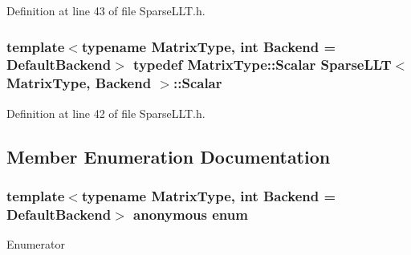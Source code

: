 Definition at line 43 of file Sparse\-L\-L\-T.\-h.

\hypertarget{class_sparse_l_l_t_acc629078ed9cd42c5d1d2c16012de3a4}{
\subsubsection[{Scalar}]{\setlength{\rightskip}{0pt plus 5cm}template$<$typename Matrix\-Type, int Backend = Default\-Backend$>$ typedef Matrix\-Type\-::\-Scalar {\bf Sparse\-L\-L\-T}$<$ Matrix\-Type, Backend $>$\-::{\bf Scalar}\hspace{0.3cm}{\ttfamily [protected]}}}\label{class_sparse_l_l_t_acc629078ed9cd42c5d1d2c16012de3a4}


Definition at line 42 of file Sparse\-L\-L\-T.\-h.



\subsection{Member Enumeration Documentation}
\hypertarget{class_sparse_l_l_t_a50fce5d91eb8e231d89c5d4eef658701}{\subsubsection[{anonymous enum}]{\setlength{\rightskip}{0pt plus 5cm}template$<$typename Matrix\-Type, int Backend = Default\-Backend$>$ anonymous enum\hspace{0.3cm}{\ttfamily [protected]}}}\label{class_sparse_l_l_t_a50fce5d91eb8e231d89c5d4eef658701}
\begin{Desc}
\item[Enumerator]\par
\begin{description}
\item[{\em 
\hypertarget{class_sparse_l_l_t_a50fce5d91eb8e231d89c5d4eef658701a8bbc2f3421ec39f84eafa0133cb33520}{Supernodal\-Factor\-Is\-Dirty}\label{class_sparse_l_l_t_a50fce5d91eb8e231d89c5d4eef658701a8bbc2f3421ec39f84eafa0133cb33520}
}]\item[{\em 
\hypertarget{class_sparse_l_l_t_a50fce5d91eb8e231d89c5d4eef658701a4880ae3a4fb0f2dde160db51dc21545b}{Matrix\-L\-Is\-Dirty}\label{class_sparse_l_l_t_a50fce5d91eb8e231d89c5d4eef658701a4880ae3a4fb0f2dde160db51dc21545b}
}]\end{description}
\end{Desc}


